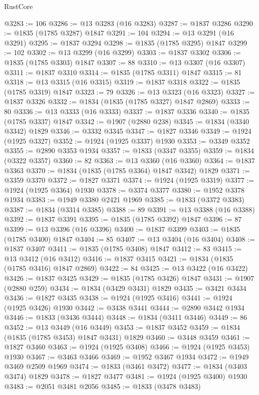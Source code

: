 \begin{lexlean}{RustCore}
\begin{coremodule}
@3283 := 106
@3286 := @13 @3283 (@16 @3283)
@3287 := @1837 @3286
@3290 := @1835 (@1785 @3287) @1847
@3291 := 104
@3294 := @13 @3291 (@16 @3291)
@3295 := @1837 @3294
@3298 := @1835 (@1785 @3295) @1847
@3299 := 102
@3302 := @13 @3299 (@16 @3299)
@3303 := @1837 @3302
@3306 := @1835 (@1785 @3303) @1847
@3307 := 88
@3310 := @13 @3307 (@16 @3307)
@3311 := @1837 @3310
@3314 := @1835 (@1785 @3311) @1847
@3315 := 81
@3318 := @13 @3315 (@16 @3315)
@3319 := @1837 @3318
@3322 := @1835 (@1785 @3319) @1847
@3323 := 79
@3326 := @13 @3323 (@16 @3323)
@3327 := @1837 @3326
@3332 := @1834 (@1835 (@1785 @3327) @1847 @2869)
@3333 := 80
@3336 := @13 @3333 (@16 @3333)
@3337 := @1837 @3336
@3340 := @1835 (@1785 @3337) @1847
@3342 := @1907 (@2880 @238)
@3345 := @1834 (@3340 @3342) @1829
@3346 := @3332 @3345
@3347 := @1827 @3346
@3349 := @1924 (@1925 @3327)
@3352 := @1924 (@1925 @3337) @1930
@3353 := @3349 @3352
@3355 := @2890 @3353 @1934
@3357 := @1833 (@3347 @3355)
@3359 := @1834 (@3322 @3357)
@3360 := 82
@3363 := @13 @3360 (@16 @3360)
@3364 := @1837 @3363
@3370 := @1834 (@1835 (@1785 @3364) @1847 @3342) @1829
@3371 := @3359 @3370
@3372 := @1827 @3371
@3374 := @1924 (@1925 @3319)
@3377 := @1924 (@1925 @3364) @1930
@3378 := @3374 @3377
@3380 := @1952 @3378 @1934
@3383 := @1949 @3380 @2421 @1969
@3385 := @1833 (@3372 @3383)
@3387 := @1834 (@3314 @3385)
@3388 := 89
@3391 := @13 @3388 (@16 @3388)
@3392 := @1837 @3391
@3395 := @1835 (@1785 @3392) @1847
@3396 := 87
@3399 := @13 @3396 (@16 @3396)
@3400 := @1837 @3399
@3403 := @1835 (@1785 @3400) @1847
@3404 := 85
@3407 := @13 @3404 (@16 @3404)
@3408 := @1837 @3407
@3411 := @1835 (@1785 @3408) @1847
@3412 := 83
@3415 := @13 @3412 (@16 @3412)
@3416 := @1837 @3415
@3421 := @1834 (@1835 (@1785 @3416) @1847 @2869)
@3422 := 84
@3425 := @13 @3422 (@16 @3422)
@3426 := @1837 @3425
@3429 := @1835 (@1785 @3426) @1847
@3431 := @1907 (@2880 @259)
@3434 := @1834 (@3429 @3431) @1829
@3435 := @3421 @3434
@3436 := @1827 @3435
@3438 := @1924 (@1925 @3416)
@3441 := @1924 (@1925 @3426) @1930
@3442 := @3438 @3441
@3444 := @2890 @3442 @1934
@3446 := @1833 (@3436 @3444)
@3448 := @1834 (@3411 @3446)
@3449 := 86
@3452 := @13 @3449 (@16 @3449)
@3453 := @1837 @3452
@3459 := @1834 (@1835 (@1785 @3453) @1847 @3431) @1829
@3460 := @3448 @3459
@3461 := @1827 @3460
@3463 := @1924 (@1925 @3408)
@3466 := @1924 (@1925 @3453) @1930
@3467 := @3463 @3466
@3469 := @1952 @3467 @1934
@3472 := @1949 @3469 @2509 @1969
@3474 := @1833 (@3461 @3472)
@3477 := @1834 (@3403 @3474) @1829
@3478 := @1827 @3477
@3481 := @1924 (@1925 @3400) @1930
@3483 := @2051 @3481 @2056
@3485 := @1833 (@3478 @3483)

\end{coremodule}
\end{lexlean}
